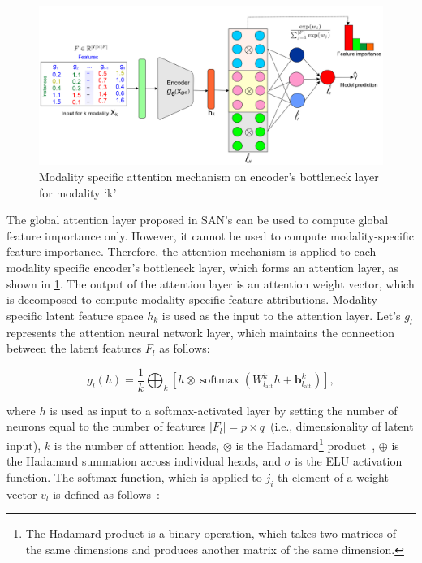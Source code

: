 \begin{figure}
	\centering
	\includegraphics[scale=0.55]{images/k_attention.png}
	\caption{Modality specific attention mechanism on encoder's bottleneck layer for modality `k'}	
	\label{fig:k_attention}
\end{figure}

\hspace*{3.5mm} The global attention layer proposed in SAN's can be used to compute  global feature importance only. %
However, it cannot be used to compute modality-specific feature importance. Therefore, the attention mechanism is applied to each modality specific encoder's bottleneck layer, which forms an attention layer, as shown in \cref{fig:k_attention}. The output of the attention layer is an attention weight vector, which is decomposed to compute modality specific feature attributions.
Modality specific latent feature space $h_k$ is used as the input to the attention layer. Let's $g_l$ represents the attention neural network layer, which maintains the connection between the latent features $F_l$ as follows: 

\begin{equation}
    g_l(h)=\frac{1}{k} \bigoplus_{k}\left[h \otimes \operatorname{softmax}\left(W_{l_{\mathrm{att}}}^{k} h+\boldsymbol{b}_{l_{\mathrm{att}}}^{k}\right)\right],
\end{equation}

\hspace*{3.5mm} where $h$ is used as input to a softmax-activated layer by setting the number of neurons equal to the number of features $|F_l|= p \times q $~(i.e., dimensionality of latent input), $k$ is the number of attention heads, $\otimes$ is the Hadamard\footnote{The Hadamard product is a binary operation, which takes two matrices of the same dimensions and produces another matrix of the same dimension.} product~\cite{horn1990hadamard}, $\oplus$ is the Hadamard summation across individual heads, and $\sigma$ is the ELU activation function. The softmax function, which is applied to $j_{i}$-th element of a weight vector $v_l$ is defined as follows~\cite{vskrlj2020feature}:

